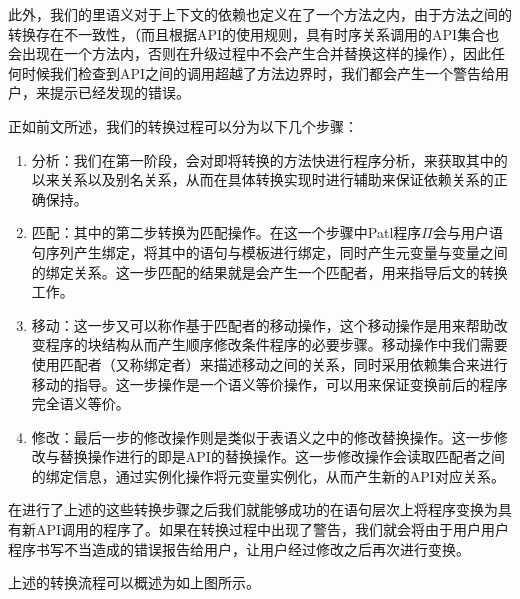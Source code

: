 此外，我们的里语义对于上下文的依赖也定义在了一个方法之内，由于方法之间的转换存在不一致性，（而且根据API的使用规则，具有时序关系调用的API集合也会出现在一个方法内，否则在升级过程中不会产生合并替换这样的操作），因此任何时候我们检查到API之间的调用超越了方法边界时，我们都会产生一个警告给用户，来提示已经发现的错误。

正如前文所述，我们的转换过程可以分为以下几个步骤：

\begin{enumerate}
\item 分析：我们在第一阶段，会对即将转换的方法快进行程序分析，来获取其中的以来关系以及别名关系，从而在具体转换实现时进行辅助来保证依赖关系的正确保持。
\item 匹配：其中的第二步转换为匹配操作。在这一个步骤中Patl程序$\Pi$会与用户语句序列产生绑定，将其中的语句与模板进行绑定，同时产生元变量与变量之间的绑定关系。这一步匹配的结果就是会产生一个匹配者，用来指导后文的转换工作。
\item 移动：这一步又可以称作基于匹配者的移动操作，这个移动操作是用来帮助改变程序的块结构从而产生顺序修改条件程序的必要步骤。移动操作中我们需要使用匹配者（又称绑定者）来描述移动之间的关系，同时采用依赖集合来进行移动的指导。这一步操作是一个语义等价操作，可以用来保证变换前后的程序完全语义等价。
\item 修改：最后一步的修改操作则是类似于表语义之中的修改替换操作。这一步修改与替换操作进行的即是API的替换操作。这一步修改操作会读取匹配者之间的绑定信息，通过实例化操作将元变量实例化，从而产生新的API对应关系。
\end{enumerate}

在进行了上述的这些转换步骤之后我们就能够成功的在语句层次上将程序变换为具有新API调用的程序了。如果在转换过程中出现了警告，我们就会将由于用户用户程序书写不当造成的错误报告给用户，让用户经过修改之后再次进行变换。

\begin{center}
\DP
\end{center}

上述的转换流程可以概述为如上图所示。

